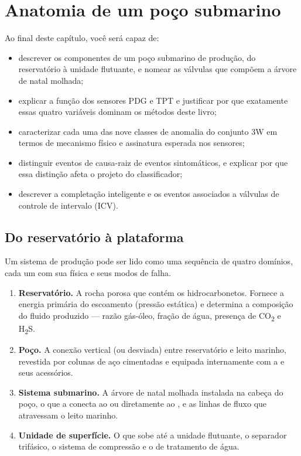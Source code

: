 \chapter{Anatomia de um poço submarino}
\label{cap:dominio}

\begin{objetivos}
Ao final deste capítulo, você será capaz de:
\begin{itemize}[leftmargin=*,itemsep=0.2em]
  \item descrever os componentes de um poço submarino de produção, do reservatório à
        unidade flutuante, e nomear as válvulas que compõem a árvore de natal molhada;
  \item explicar a função dos sensores PDG e TPT e justificar por que exatamente essas
        quatro variáveis dominam os métodos deste livro;
  \item caracterizar cada uma das nove classes de anomalia do conjunto 3W em termos de
        mecanismo físico e assinatura esperada nos sensores;
  \item distinguir eventos de causa-raiz de eventos sintomáticos, e explicar por que
        essa distinção afeta o projeto do classificador;
  \item descrever a completação inteligente e os eventos associados a válvulas de
        controle de intervalo (ICV).
\end{itemize}
\end{objetivos}

\section{Do reservatório à plataforma}

Um sistema de produção  pode ser lido como uma sequência de quatro
domínios, cada um com sua física e seus modos de falha.

\begin{enumerate}[leftmargin=*,itemsep=0.5em]
  \item \textbf{Reservatório.} A rocha porosa que contém os hidrocarbonetos. Fornece a
        energia primária do escoamento (pressão estática) e determina a composição do
        fluido produzido --- razão gás-óleo, fração de água, presença de
        CO\textsubscript{2} e H\textsubscript{2}S.
  \item \textbf{Poço.} A conexão vertical (ou desviada) entre reservatório e leito
        marinho, revestida por colunas de aço cimentadas e equipada internamente com a
         e seus acessórios.
  \item \textbf{Sistema submarino.} A árvore de natal molhada instalada na cabeça do
        poço, o  que a conecta ao  ou diretamente ao
        , e as linhas de fluxo que atravessam o leito marinho.
  \item \textbf{Unidade de superfície.} O  que sobe até a unidade flutuante,
        o separador trifásico, o sistema de compressão e o de tratamento de água.
\end{enumerate}

